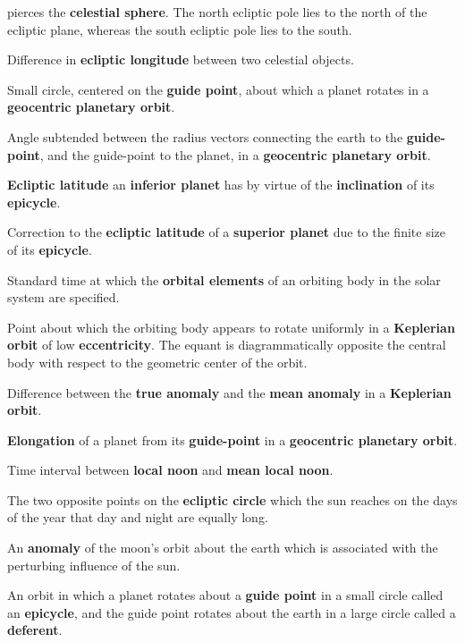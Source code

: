 {\begin{description}
pierces the {\bf celestial sphere}. The north ecliptic pole lies to the north
of the ecliptic plane, whereas the south ecliptic
pole lies to the south.
\item [Elongation:] Difference in {\bf ecliptic longitude}\/ between two
celestial objects.
\item [Epicycle:] Small circle, centered on the {\bf guide point}, about which a planet rotates in a {\bf geocentric planetary orbit}. 
\item [Epicyclic Anomaly:] Angle subtended between the radius vectors
connecting the earth to the {\bf guide-point}, and the guide-point to the
planet, in a {\bf geocentric planetary orbit}. 
\item[Epicyclic Latitude:] {\bf Ecliptic latitude}\/ an {\bf inferior planet}\/
has by virtue of the {\bf inclination}\/ of its {\bf epicycle}.
\item[Epicyclic Latitude Correction Factor:] Correction to the
{\bf ecliptic latitude}\/ of a {\bf superior planet}\/ due to the finite size of 
its {\bf epicycle}.
\item [Epoch:] Standard time at which the {\bf orbital elements}\/ of an orbiting body in the solar system are specified.
\item [Equant:] Point about which the orbiting body appears to
rotate uniformly in a  {\bf Keplerian
orbit}\/ of low {\bf eccentricity}. The equant is diagrammatically opposite the central
body with respect to the geometric center of the orbit.
\item [Equation of Center:] Difference between the {\bf true anomaly}\/ and the {\bf mean anomaly}\/ in a {\bf Keplerian orbit}. 
\item [Equation of Epicycle:] {\bf Elongation}\/ of a planet from its
{\bf guide-point}\/ in a {\bf geocentric planetary orbit}. 
\item [Equation of Time:] Time interval between {\bf local noon}\/
and {\bf mean local noon}.
\item [Equinoxes:] The two opposite points on the {\bf ecliptic circle}\/ which
 the sun reaches on the days of the year that day and night are equally long.
 \item[Evection:] An {\bf anomaly}\/ of the moon's orbit about the earth which is associated
 with the perturbing influence of the sun. 
\item [Geocentric Planetary Orbit:] An orbit in which a planet rotates
about a {\bf guide point}\/ in a small circle called an {\bf epicycle}, and
the guide point rotates about the earth in a large circle called a {\bf deferent}.

\end{description}}
